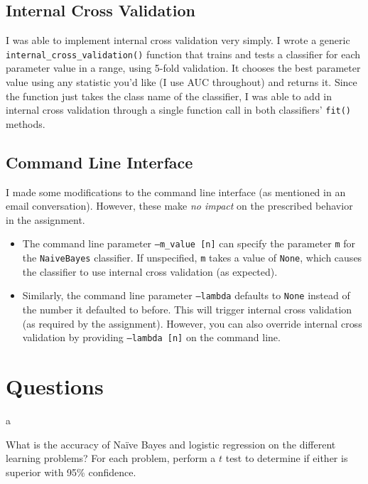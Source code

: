 \documentclass[fleqn]{homework}
\begin{document}
  \subsection{Internal Cross Validation}

  I was able to implement internal cross validation very simply.  I wrote a
  generic \texttt{internal\_cross\_validation()} function that trains and tests
  a classifier for each parameter value in a range, using 5-fold validation.  It
  chooses the best parameter value using any statistic you'd like (I use AUC
  throughout) and returns it.  Since the function just takes the class name of
  the classifier, I was able to add in internal cross validation through a
  single function call in both classifiers' \texttt{fit()} methods.

  \subsection{Command Line Interface}

  I made some modifications to the command line interface (as mentioned in an
  email conversation).  However, these make \textit{no impact} on the prescribed
  behavior in the assignment.

  \begin{itemize}
  \item The command line parameter \texttt{--m\_value [n]} can specify the
    parameter \texttt{m} for the \texttt{NaiveBayes} classifier.  If
    unspecified, \texttt{m} takes a value of \texttt{None}, which causes the
    classifier to use internal cross validation (as expected).
  \item Similarly, the command line parameter \texttt{--lambda} defaults to
    \texttt{None} instead of the number it defaulted to before.  This will
    trigger internal cross validation (as required by the assignment).  However,
    you can also override internal cross validation by providing
    \texttt{--lambda [n]} on the command line.
  \end{itemize}

  \section{Questions}

  \begin{problem}{a}
    \begin{question}
      What is the accuracy of Na\"ive Bayes and logistic regression on the
      different learning problems?  For each problem, perform a $t$ test to
      determine if either is superior with 95\% confidence.
    \end{question}
  \end{problem}
\end{document}
